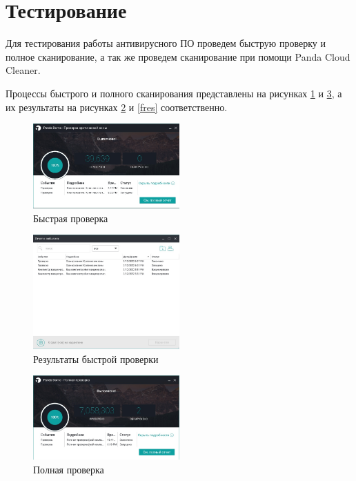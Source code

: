     \section{Тестирование}
        Для тестирования работы антивирусного ПО проведем быструю проверку и полное сканирование, а так же проведем сканирование при помощи
        Panda Cloud Cleaner.\par
        Процессы быстрого и полного сканирования представлены на рисунках \ref{qscan} и \ref{fscan}, а их результаты на рисунках \ref{qres} и \ref{fres}
        соответственно.
        \begin{figure}[h]
            \centering
            \includegraphics[width=0.5\textwidth]{pics/qscan}
            \caption{Быстрая проверка}
            \label{qscan}
        \end{figure}
        \begin{figure}
            \centering
            \includegraphics[width=0.5\textwidth]{pics/qscan-results}
            \caption{Результаты быстрой проверки}
            \label{qres}
        \end{figure}
        \begin{figure}
            \centering
            \includegraphics[width=0.5\textwidth]{pics/fscan}
            \caption{Полная проверка}
            \label{fscan}
        \end{figure}
